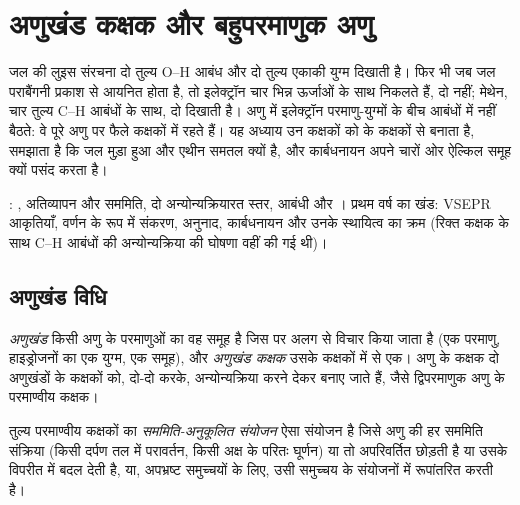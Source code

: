 \chapter{अणुखंड कक्षक और बहुपरमाणुक अणु}\label{ch:b2:fragment-orbitals}

जल की लुइस संरचना दो तुल्य O--H आबंध और दो
तुल्य एकाकी युग्म दिखाती है। फिर भी जब जल पराबैंगनी प्रकाश से आयनित होता है, तो
इलेक्ट्रॉन चार भिन्न ऊर्जाओं के साथ निकलते हैं, दो नहीं; मेथेन, चार
तुल्य C--H आबंधों के साथ, दो दिखाती है। अणु में इलेक्ट्रॉन परमाणु-युग्मों के बीच
आबंधों में नहीं बैठते: वे पूरे अणु पर फैले कक्षकों में रहते हैं।
यह अध्याय उन कक्षकों को  के कक्षकों से बनाता है, समझाता है कि
जल मुड़ा हुआ और एथीन समतल क्यों है, और कार्बधनायन अपने चारों ओर
ऐल्किल समूह क्यों पसंद करता है।

\begin{recall}
: , अतिव्यापन और सममिति, दो अन्योन्यक्रियारत स्तर,
आबंधी और । प्रथम वर्ष का खंड: VSEPR आकृतियाँ, वर्णन के रूप में
संकरण, अनुनाद, कार्बधनायन और उनके स्थायित्व का क्रम (रिक्त कक्षक के साथ
C--H आबंधों की अन्योन्यक्रिया की घोषणा वहीं की गई थी)।
\end{recall}

\section{अणुखंड विधि}

\begin{definition}[अणुखंड]\label{def:b2:fragment-orbitals:fragment}
\emph{अणुखंड} किसी अणु के परमाणुओं का वह समूह है जिस पर
अलग से विचार किया जाता है (एक परमाणु, हाइड्रोजनों का एक युग्म, एक  समूह), और \emph{अणुखंड
कक्षक} उसके कक्षकों में से एक। अणु के कक्षक
दो अणुखंडों के कक्षकों को, दो-दो करके, अन्योन्यक्रिया करने देकर बनाए जाते हैं,
जैसे द्विपरमाणुक अणु के परमाण्वीय कक्षक।
\end{definition}

\begin{definition}[सममिति-अनुकूलित संयोजन]\label{def:b2:fragment-orbitals:symmetry-adapted}
तुल्य परमाण्वीय कक्षकों का \emph{सममिति-अनुकूलित संयोजन}
ऐसा संयोजन है जिसे अणु की हर सममिति संक्रिया (किसी दर्पण तल में
परावर्तन, किसी अक्ष के परितः घूर्णन) या तो अपरिवर्तित छोड़ती है या उसके विपरीत में बदल देती है,
या, अपभ्रष्ट समुच्चयों के लिए, उसी समुच्चय के संयोजनों में
रूपांतरित करती है।
\end{definition}

